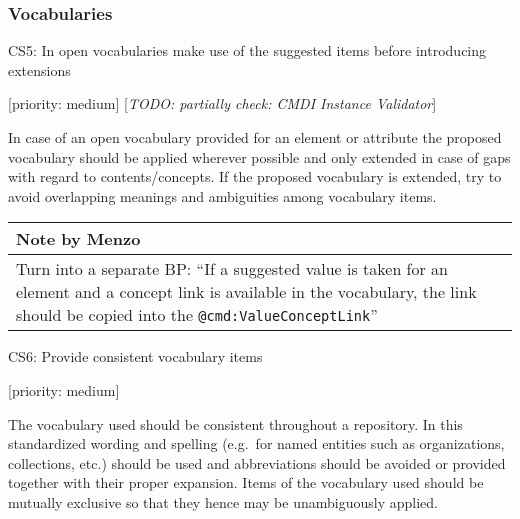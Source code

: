 \documentclass[]{article}
\begin{document}
\subsubsection{Vocabularies}\label{vocabularies}

CS5: In open vocabularies make use of the suggested items before
introducing extensions

{[}priority: medium{]} {[}\emph{TODO: partially check: CMDI Instance
Validator}{]}

In case of an open vocabulary provided for an element or attribute the
proposed vocabulary should be applied wherever possible and only
extended in case of gaps with regard to contents/concepts. If the
proposed vocabulary is extended, try to avoid overlapping meanings and
ambiguities among vocabulary items.

\begin{longtable}[c]{@{}l@{}}
\toprule
\begin{minipage}[b]{0.07\columnwidth}\raggedright\strut
Note by Menzo
\strut\end{minipage}\tabularnewline
\midrule
\endhead
\begin{minipage}[t]{0.07\columnwidth}\raggedright\strut
Turn into a separate BP: ``If a suggested value is taken for an element
and a concept link is available in the vocabulary, the link should be
copied into the \texttt{@cmd:ValueConceptLink}''
\strut\end{minipage}\tabularnewline
\bottomrule
\end{longtable}

CS6: Provide consistent vocabulary items

{[}priority: medium{]}

The vocabulary used should be consistent throughout a repository. In
this standardized wording and spelling (e.g.~for named entities such as
organizations, collections, etc.) should be used and abbreviations
should be avoided or provided together with their proper expansion.
Items of the vocabulary used should be mutually exclusive so that they
hence may be unambiguously applied.
\end{document}

